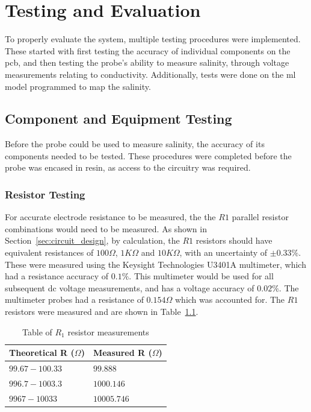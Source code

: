 \chapter{Testing and Evaluation}

To properly evaluate the system, multiple testing procedures were implemented.
These started with first testing the accuracy of individual components on the \gls{pcb}, and then testing the probe's ability to measure salinity, through voltage measurements relating to conductivity.
Additionally, tests were done on the \gls{ml} model programmed to map the salinity.

\section{Component and Equipment Testing}
Before the probe could be used to measure salinity, the accuracy of its components needed to be tested.
These procedures were completed before the probe was encased in resin, as access to the circuitry was required.

\subsection{Resistor Testing}
For accurate electrode resistance to be measured, the the $R1$ parallel resistor combinations would need to be measured.
As shown in Section~\ref{sec:circuit_design}, by calculation, the $R1$ resistors should have equivalent resistances of $100\Omega$, $1K\Omega$ and $10K\Omega$, with an uncertainty of $\pm0.33\%$.
These were measured using the Keysight Technologies U3401A multimeter, which had a resistance accuracy of $0.1\%$.
This multimeter would be used for all subsequent \gls{dc} voltage measurements, and has a voltage accuracy of $0.02\%$.
The multimeter probes had a resistance of $0.154\Omega$ which was accounted for.
The $R1$ resistors were measured and are shown in Table~\ref{table:resistance_test}.


\begingroup
    \renewcommand{\arraystretch}{1.8} %
    \begin{table}[h!]
        \centering
            \begin{tabular}{|>{\centering\arraybackslash}p{5cm}|
                >{\centering\arraybackslash}m{5cm}|}
            \hline
            Theoretical R ($\Omega$) & Measured R ($\Omega$) \\ \hline
            $99.67-100.33$ & $99.888$ \\ \hline
            $996.7-1003.3$ & $1000.146$ \\ \hline
            $9967-10033$ & $10005.746$ \\ \hline
            \end{tabular}
        \caption{Table of $R_1$ resistor measurements}
        \label{table:resistance_test}
    \end{table}
\endgroup

